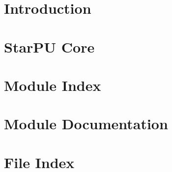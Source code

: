 \chapter{Introduction}
\label{index}
\hypertarget{index}{}


\chapter{Star\+PU Core}
\label{StarPUCore}
\hypertarget{StarPUCore}{}


\chapter{Module Index}


\chapter{Module Documentation}
\label{ModuleDocumentation}
\hypertarget{ModuleDocumentation}{}



\chapter{File Index}


